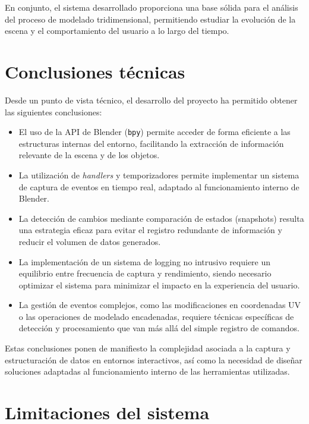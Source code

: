 En conjunto, el sistema desarrollado proporciona una base sólida para el análisis del proceso de modelado tridimensional, permitiendo estudiar la evolución de la escena y el comportamiento del usuario a lo largo del tiempo.

\section{Conclusiones técnicas}

Desde un punto de vista técnico, el desarrollo del proyecto ha permitido obtener las siguientes conclusiones:

\begin{itemize}

    \item El uso de la API de Blender (\texttt{bpy}) permite acceder de forma eficiente a las estructuras internas del entorno, facilitando la extracción de información relevante de la escena y de los objetos.

    \item La utilización de \textit{handlers} y temporizadores permite implementar un sistema de captura de eventos en tiempo real, adaptado al funcionamiento interno de Blender.

    \item La detección de cambios mediante comparación de estados (snapshots) resulta una estrategia eficaz para evitar el registro redundante de información y reducir el volumen de datos generados.

    \item La implementación de un sistema de logging no intrusivo requiere un equilibrio entre frecuencia de captura y rendimiento, siendo necesario optimizar el sistema para minimizar el impacto en la experiencia del usuario.

    \item La gestión de eventos complejos, como las modificaciones en coordenadas UV o las operaciones de modelado encadenadas, requiere técnicas específicas de detección y procesamiento que van más allá del simple registro de comandos.

\end{itemize}

Estas conclusiones ponen de manifiesto la complejidad asociada a la captura y estructuración de datos en entornos interactivos, así como la necesidad de diseñar soluciones adaptadas al funcionamiento interno de las herramientas utilizadas.

\section{Limitaciones del sistema}

